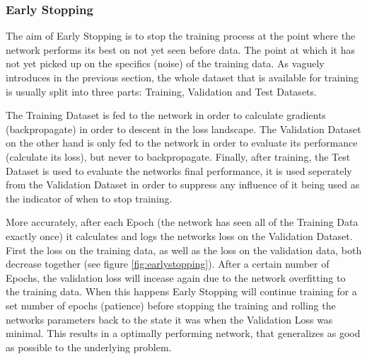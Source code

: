 \documentclass[a4paper,10pt]{scrartcl}
\begin{document}
\subsubsection*{Early Stopping}
\label{earlystopping}

The aim of Early Stopping is to stop the training process at the point where the network performs its best on not yet seen before data.
The point at which it has not yet picked up on the specifics (noise) of the training data.
As vaguely introduces in the previous section, the whole dataset that is available for training is usually split into three parts: Training, Validation and Test Datasets.

The Training Dataset is fed to the network in order to calculate gradients (backpropagate) in order to descent in the loss landscape.
The Validation Dataset on the other hand is only fed to the network in order to evaluate its performance (calculate its loss), but never to backpropagate.
Finally, after training, the Test Dataset is used to evaluate the networks final performance, it is used seperately from the Validation Dataset in order to suppress any influence of it being used as the indicator of when to stop training.

More accurately, after each Epoch (the network has seen all of the Training Data exactly once) it calculates and logs the networks loss on the Validation Dataset.
First the loss on the training data, as well as the loss on the validation data, both decrease together (see figure \ref{fig:earlystopping}).
After a certain number of Epochs, the validation loss will incease again due to the network overfitting to the training data.
When this happens Early Stopping will continue training for a set number of epochs (patience) before stopping the training and rolling the networks parameters back to the state it was when the Validation Loss was minimal.
This results in a optimally performing network, that generalizes as good as possible to the underlying problem.
\end{document}
